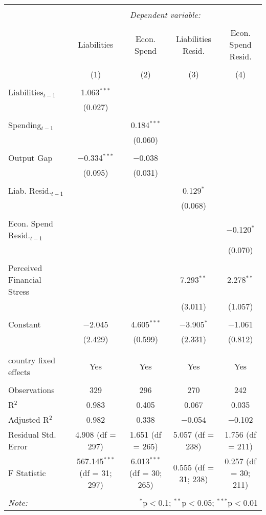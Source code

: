 
\begingroup 
\tiny 
\begin{tabular}{@{\extracolsep{5pt}}lcccc} 
\\[-1.8ex]\hline 
\hline \\[-1.8ex] 
 & \multicolumn{4}{c}{\textit{Dependent variable:}} \\ 
\cline{2-5} 
\\[-1.8ex] & Liabilities & Econ. Spend & Liabilities Resid. & Econ. Spend Resid. \\ 
\\[-1.8ex] & (1) & (2) & (3) & (4)\\ 
\hline \\[-1.8ex] 
 Liabilities$_{t-1}$ & 1.063$^{***}$ &  &  &  \\ 
  & (0.027) &  &  &  \\ 
  & & & & \\ 
 Spending$_{t-1}$ &  & 0.184$^{***}$ &  &  \\ 
  &  & (0.060) &  &  \\ 
  & & & & \\ 
 Output Gap & $-$0.334$^{***}$ & $-$0.038 &  &  \\ 
  & (0.095) & (0.031) &  &  \\ 
  & & & & \\ 
 Liab. Resid.$_{t-1}$ &  &  & 0.129$^{*}$ &  \\ 
  &  &  & (0.068) &  \\ 
  & & & & \\ 
 Econ. Spend Resid.$_{t-1}$ &  &  &  & $-$0.120$^{*}$ \\ 
  &  &  &  & (0.070) \\ 
  & & & & \\ 
 Perceived Financial Stress &  &  & 7.293$^{**}$ & 2.278$^{**}$ \\ 
  &  &  & (3.011) & (1.057) \\ 
  & & & & \\ 
 Constant & $-$2.045 & 4.605$^{***}$ & $-$3.905$^{*}$ & $-$1.061 \\ 
  & (2.429) & (0.599) & (2.331) & (0.812) \\ 
  & & & & \\ 
\hline \\[-1.8ex] 
country fixed effects & Yes & Yes & Yes & Yes \\ 
\hline \\[-1.8ex] 
Observations & 329 & 296 & 270 & 242 \\ 
R$^{2}$ & 0.983 & 0.405 & 0.067 & 0.035 \\ 
Adjusted R$^{2}$ & 0.982 & 0.338 & $-$0.054 & $-$0.102 \\ 
Residual Std. Error & 4.908 (df = 297) & 1.651 (df = 265) & 5.057 (df = 238) & 1.756 (df = 211) \\ 
F Statistic & 567.145$^{***}$ (df = 31; 297) & 6.013$^{***}$ (df = 30; 265) & 0.555 (df = 31; 238) & 0.257 (df = 30; 211) \\ 
\hline 
\hline \\[-1.8ex] 
\textit{Note:}  & \multicolumn{4}{r}{$^{*}$p$<$0.1; $^{**}$p$<$0.05; $^{***}$p$<$0.01} \\ 
\end{tabular} 
\endgroup 

